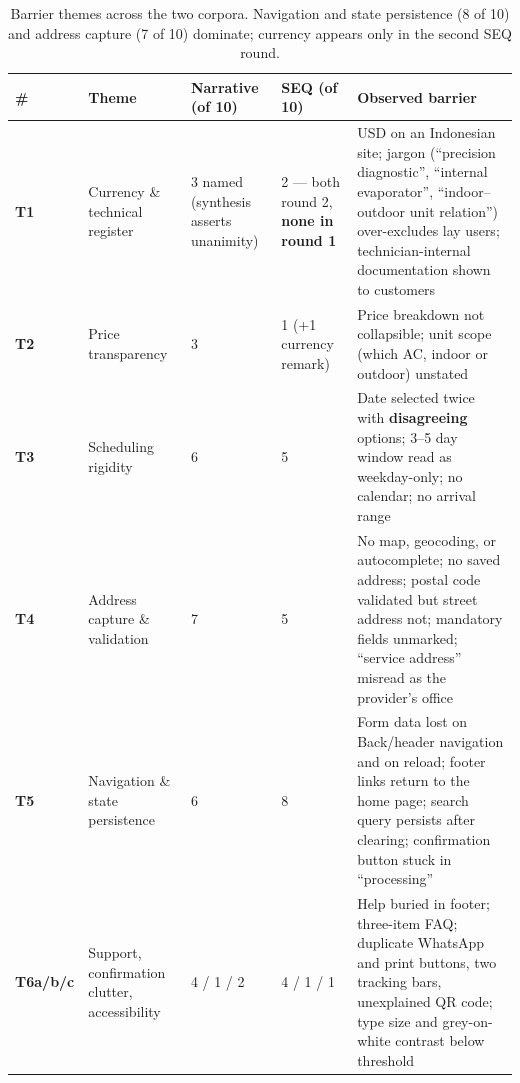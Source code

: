 \documentclass[]{interact}
\theoremstyle{plain}
\begin{document}
\begin{table}[htbp]
\caption{Barrier themes across the two corpora. Navigation and state persistence (8 of 10) and address
capture (7 of 10) dominate; currency appears only in the second SEQ round.}
{\footnotesize
\begin{tabular}{@{}p{} p{} p{} p{} p{}@{}}
\toprule
\textbf{\#} & \textbf{Theme} & \textbf{Narrative (of 10)} & \textbf{SEQ (of 10)} & \textbf{Observed barrier} \\
\midrule
\textbf{T1} & Currency \& technical register & 3 named (synthesis asserts unanimity) & 2 --- both round 2, \textbf{none in round 1} & USD on an Indonesian site; jargon (``precision diagnostic'', ``internal evaporator'', ``indoor--outdoor unit relation'') over-excludes lay users; technician-internal documentation shown to customers \\
\textbf{T2} & Price transparency & 3 & 1 (+1 currency remark) & Price breakdown not collapsible; unit scope (which AC, indoor or outdoor) unstated \\
\textbf{T3} & Scheduling rigidity & 6 & 5 & Date selected twice with \textbf{disagreeing} options; 3--5 day window read as weekday-only; no calendar; no arrival range \\
\textbf{T4} & Address capture \& validation & 7 & 5 & No map, geocoding, or autocomplete; no saved address; postal code validated but street address not; mandatory fields unmarked; ``service address'' misread as the provider's office \\
\textbf{T5} & Navigation \& state persistence & 6 & 8 & Form data lost on Back/header navigation and on reload; footer links return to the home page; search query persists after clearing; confirmation button stuck in ``processing'' \\
\textbf{T6a/b/c} & Support, confirmation clutter, accessibility & 4 / 1 / 2 & 4 / 1 / 1 & Help buried in footer; three-item FAQ; duplicate WhatsApp and print buttons, two tracking bars, unexplained QR code; type size and grey-on-white contrast below threshold \\
\bottomrule
\end{tabular}}
\end{table}
\end{document}
